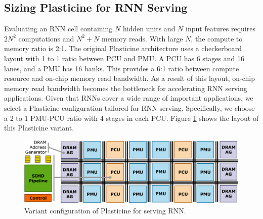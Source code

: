 \subsection{Sizing Plasticine for RNN Serving} \label{sec:sizing}
Evaluating an RNN cell containing $N$ hidden units and $N$ input features
  requires $2N^2$ computations and $N^2+N$ memory reads.
With large $N$, the compute to memory ratio is 2:1.
The original Plasticine architecture uses a checkerboard layout
  with 1 to 1 ratio between PCU and PMU.
A PCU has 6 stages and 16 lanes, and a PMU has 16 banks.
This provides a 6:1 ratio between
  compute resource and on-chip memory read bandwidth.
As a result of this layout,
  on-chip memory read bandwidth becomes the bottleneck for accelerating RNN serving applications.
Given that RNNs cover a wide range of important applications,
  we select a Plasticine configuration tailored for RNN serving.
Specifically, we choose a 2 to 1 PMU-PCU ratio with 4 stages in each PCU.
Figure \ref{fig:arch} shows the layout of this Plasticine variant.
\begin{figure}
  \centering
  \includegraphics[width=\columnwidth]{figs/arch.pdf}
  \caption{Variant configuration of Plasticine for serving RNN.}
  \label{fig:arch}
  \vspace*{-0.2in}
\end{figure}
